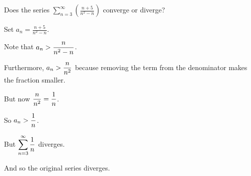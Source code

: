 \documentclass{ximera}
\begin{document}
\begin{question}
  Does the series \(\displaystyle\sum_{n=3}^\infty \left( \displaystyle\frac{n + 5}{n^{2} - n} \right)\) converge or diverge?
  
  \begin{solution}
    \begin{hint}
      Set \(a_n = \displaystyle\frac{n + 5}{n^{2} - n}\).
    \end{hint}
    \begin{hint}
      Note that \(a_n > \displaystyle\displaystyle\frac{n}{n^{2} - n}\).
    \end{hint}
    \begin{hint}
      Furthermore, \(a_n > \displaystyle\displaystyle\frac{n}{n^{2}}\) because removing the term from the denominator makes the fraction smaller.
    \end{hint}
    \begin{hint}
      But now \(\displaystyle\displaystyle\frac{n}{n^{2}} = \displaystyle\displaystyle\frac{1}{n}\).
    \end{hint}
    \begin{hint}
      So \(a_n > \displaystyle\displaystyle\frac{1}{n}\).
    \end{hint}
    \begin{hint}
      But \(\displaystyle\sum_{n = 3}^\infty \displaystyle\displaystyle\frac{1}{n}\) diverges.
    \end{hint}
    \begin{hint}
      And so the original series diverges.
    \end{hint}

    \begin{multiple-choice}
      
    \end{multiple-choice}
    
  \end{solution}
\end{question}
\end{document}
